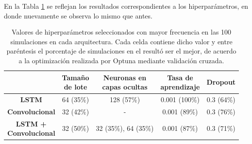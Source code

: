 \documentclass[../../main.tex]{subfiles}
\begin{document}
En la Tabla \ref{tab:hyperparams_exp3} se reflejan los resultados correspondientes
a los hiperparámetros, en donde nuevamente se observa lo mismo que antes.

\begin{table}[H]
    \centering
    \renewcommand{\arraystretch}{1.2}
    \begin{tabular}{|c|c|c|c|c|}
        \hline
            & \makecell{\textbf{Tamaño}\\\textbf{de lote}}
            & \makecell{\textbf{Neuronas en}\\\textbf{capas ocultas}}
            & \makecell{\textbf{Tasa de}\\\textbf{aprendizaje}}
            & \textbf{Dropout} \\ \hline\hline
        \textbf{LSTM}
            & 64 (35\%) & 128 (57\%) & 0.001 (100\%) & 0.3 (64\%) \\ \hline
        \textbf{Convolucional}
            & 32 (42\%) & -          & 0.001 (89\%)  & 0.3 (76\%) \\ \hline
        \makecell{\textbf{LSTM +}\\\textbf{Convolucional}}
            & 32 (50\%) & 32 (35\%), 64 (35\%) & 0.001 (87\%) & 0.3 (71\%) \\
        \hline
    \end{tabular}
    \caption{Valores de hiperparámetros seleccionados con mayor frecuencia en las 100
    simulaciones en cada arquitectura. Cada celda contiene dicho valor y entre paréntesis
    el porcentaje de simulaciones en el resultó ser el mejor, de acuerdo a la optimización
    realizada por Optuna mediante validación cruzada.}
    \label{tab:hyperparams_exp3}
\end{table}
\end{document}
